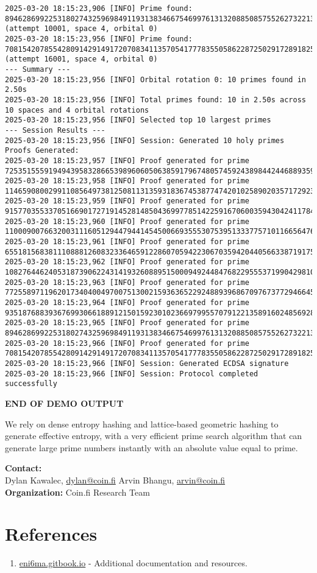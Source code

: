 \documentclass[10pt,twocolumn]{article}
\begin{document}
\begin{lstlisting}
2025-03-20 18:15:23,906 [INFO] Prime found: 89462869922531802743259698491193138346675469976131320885085755262732213889231 (attempt 10001, space 4, orbital 0)
2025-03-20 18:15:23,956 [INFO] Prime found: 70815420785542809142914917207083411357054177783550586228725029172891825716079 (attempt 16001, space 4, orbital 0)
--- Summary ---
2025-03-20 18:15:23,956 [INFO] Orbital rotation 0: 10 primes found in 2.50s
2025-03-20 18:15:23,956 [INFO] Total primes found: 10 in 2.50s across 10 spaces and 4 orbital rotations
2025-03-20 18:15:23,956 [INFO] Selected top 10 largest primes
--- Session Results ---
2025-03-20 18:15:23,956 [INFO] Session: Generated 10 holy primes
Proofs Generated:
2025-03-20 18:15:23,957 [INFO] Proof generated for prime 72535155591949439583286653989606050638591796748057459243898442446889359734351
2025-03-20 18:15:23,958 [INFO] Proof generated for prime 114659080029911085649738125081131359318367453877474201025890203571729232791779
2025-03-20 18:15:23,959 [INFO] Proof generated for prime 91577035533705166901727191452814850436997785142259167060035943042411784618011
2025-03-20 18:15:23,960 [INFO] Proof generated for prime 110009007663200311160512944794414545006693555307539513337757101166564763025363
2025-03-20 18:15:23,961 [INFO] Proof generated for prime 65518156838111088812608323364659122860705942230670359420440566338719175678611
2025-03-20 18:15:23,962 [INFO] Proof generated for prime 108276446240531873906224314193260889515000949244847682295553719904298102498283
2025-03-20 18:15:23,963 [INFO] Proof generated for prime 77255897119620173404004970075130021593636522924889396867097673772946645262731
2025-03-20 18:15:23,964 [INFO] Proof generated for prime 93518768839367699306618891215015923010236697995570791221358916024856928641679
2025-03-20 18:15:23,965 [INFO] Proof generated for prime 89462869922531802743259698491193138346675469976131320885085755262732213889231
2025-03-20 18:15:23,966 [INFO] Proof generated for prime 70815420785542809142914917207083411357054177783550586228725029172891825716079
2025-03-20 18:15:23,966 [INFO] Session: Generated ECDSA signature
2025-03-20 18:15:23,966 [INFO] Session: Protocol completed successfully
\end{lstlisting}
\textbf{END OF DEMO OUTPUT}

We rely on dense entropy hashing and lattice-based geometric hashing to generate effective entropy, with a very efficient prime search algorithm that can generate large prime numbers instantly with an absolute value equal to prime.

\begin{center}
\textbf{Contact:}\\
Dylan Kawalec, \href{mailto:dylan@coin.fi}{dylan@coin.fi} \quad\quad
Arvin Bhangu, \href{mailto:arvin@coin.fi}{arvin@coin.fi}\\[1ex]
\textbf{Organization:} Coin.fi Research Team
\end{center}

\section*{References}
\begin{enumerate}
\item \href{https://eni6ma.gitbook.io}{eni6ma.gitbook.io} - Additional documentation and resources.
\end{enumerate}
\end{document}
